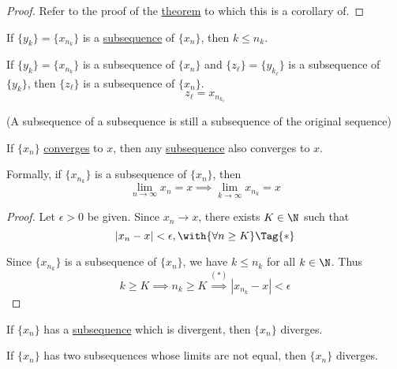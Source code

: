 \begin{proof}
  Refer to the proof of the \href{cc11aa4}{theorem} to which this is a corollary of.
\end{proof}

\label{bfa595b}

\begin{enumerati}
  \item If $\{y_k\}=\{x_{n_k}\}$ is a \href{c6b3a49}{subsequence} of $\{x_n\}$,
        then $k\leq n_k$.
  \item If $\{y_k\}=\{x_{n_k}\}$ is a subsequence of $\{x_n\}$ and
        $\{z_\ell\}=\{y_{k_\ell}\}$ is a subsequence of $\{y_k\}$, then
        $\{z_\ell\}$ is a subsequence of $\{x_n\}$.
  $$
    z_\ell=x_{n_{k_\ell}}
  $$

  (A subsequence of a subsequence is still a subsequence of the original
  sequence)
\end{enumerati}

\label{da6e7f5}

If $\{x_n\}$ \href{de3e28a}{converges} to $x$, then any
\href{c6b3a49}{subsequence} also converges to $x$.

Formally, if $\{x_{n_k}\}$ is a subsequence of $\{x_n\}$, then
$$
  \lim_{n\to\infty}x_n=x\implies\lim_{k\to\infty}x_{n_k}=x
$$

\begin{proof}
  Let $\epsilon>0$ be given. Since $x_n\to x$, there exists $K\in\N$ such that
  \begin{equation*}
    |x_n-x|<\epsilon,\with{\forall n\geq K}\Tag{*}
  \end{equation*}

  Since $\{x_{n_k}\}$ is a subsequence of $\{x_n\}$, we have $k\leq n_k$ for
  all $k\in\N$. Thus
  $$
    k\geq K\implies n_k\geq K\stackrel{(*)}{\implies}|x_{n_k}-x|<\epsilon
  $$
\end{proof}

\label{b3182b1}

\begin{enumerati}
  \item If $\{x_n\}$ has a \href{c6b3a49}{subsequence} which is divergent, then
        $\{x_n\}$ diverges.
  \item If $\{x_n\}$ has two subsequences whose limits are not equal, then
        $\{x_n\}$ diverges.
\end{enumerati}

